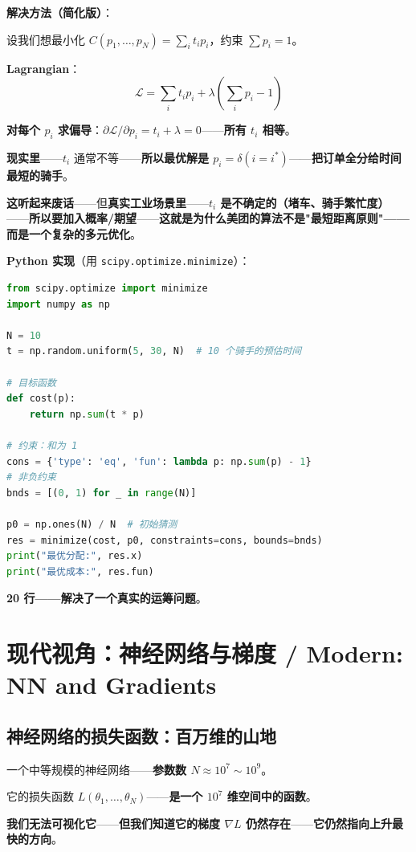 \textbf{解决方法（简化版）}：

设我们想最小化 $C(p_1, \ldots, p_N) = \sum_i t_i p_i$，约束 $\sum p_i = 1$。

\textbf{Lagrangian}：
\[
\mathcal{L} = \sum_i t_i p_i + \lambda \left( \sum_i p_i - 1 \right)
\]

\textbf{对每个 $p_i$ 求偏导}：$\partial \mathcal{L} / \partial p_i = t_i + \lambda = 0$——\textbf{所有 $t_i$ 相等}。

\textbf{现实里}——$t_i$ 通常不等——\textbf{所以最优解是 $p_i = \delta(i = i^*)$}——\textbf{把订单全分给时间最短的骑手}。

\textbf{这听起来废话}——但\textbf{真实工业场景里}——\textbf{$t_i$ 是不确定的（堵车、骑手繁忙度）}——\textbf{所以要加入概率/期望}——\textbf{这就是为什么美团的算法不是"最短距离原则"——而是一个复杂的多元优化}。

\textbf{Python 实现}（用 \texttt{scipy.optimize.minimize}）：

\begin{lstlisting}[language=Python]
from scipy.optimize import minimize
import numpy as np

N = 10
t = np.random.uniform(5, 30, N)  # 10 个骑手的预估时间

# 目标函数
def cost(p):
    return np.sum(t * p)

# 约束：和为 1
cons = {'type': 'eq', 'fun': lambda p: np.sum(p) - 1}
# 非负约束
bnds = [(0, 1) for _ in range(N)]

p0 = np.ones(N) / N  # 初始猜测
res = minimize(cost, p0, constraints=cons, bounds=bnds)
print("最优分配:", res.x)
print("最优成本:", res.fun)
\end{lstlisting}

\textbf{20 行——解决了一个真实的运筹问题}。

\section{现代视角：神经网络与梯度 / Modern: NN and Gradients}

\subsection{神经网络的损失函数：百万维的山地}

一个中等规模的神经网络——\textbf{参数数 $N \approx 10^7 \sim 10^9$}。

它的损失函数 $L(\theta_1, \ldots, \theta_N)$——\textbf{是一个 $10^7$ 维空间中的函数}。

\textbf{我们无法可视化它}——\textbf{但我们知道它的梯度 $\nabla L$ 仍然存在}——\textbf{它仍然指向上升最快的方向}。

